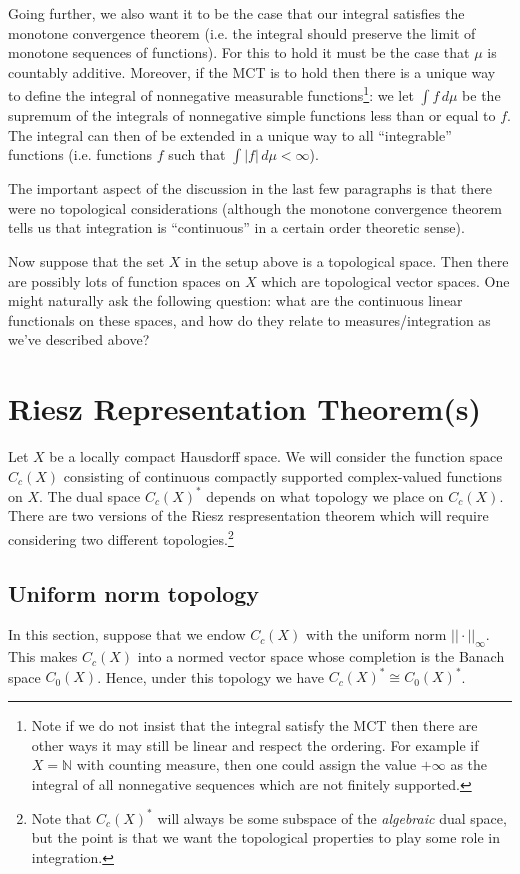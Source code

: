 \documentclass[a4paper,11pt,twoside]{amsart}
\newcommand{\N}{\mathbb{N}}
\theoremstyle{definition}
\begin{document}
Going further, we also want it to be the case that our integral satisfies the monotone convergence theorem (i.e. the integral should preserve the limit of monotone sequences of functions). For this to hold it must be the case that $\mu$ is countably additive. Moreover, if the MCT is to hold then there is a unique way to define the integral of nonnegative measurable functions\footnote{Note if we do not insist that the integral satisfy the MCT then there are other ways it may still be linear and respect the ordering. For example if $X=\N$ with counting measure, then one could assign the value $+\infty$ as the integral of all nonnegative sequences which are not finitely supported.}: we let $\int f\, d\mu$ be the supremum of the integrals of nonnegative simple functions less than or equal to $f$. The integral can then of be extended in a unique way to all ``integrable'' functions (i.e. functions $f$ such that $\int |f|\, d\mu < \infty$).

The important aspect of the discussion in the last few paragraphs is that there were no topological considerations (although the monotone convergence theorem tells us that integration is ``continuous'' in a certain order theoretic sense).

Now suppose that the set $X$ in the setup above is a topological space. Then there are possibly lots of function spaces on $X$ which are topological vector spaces. One might naturally ask the following question: what are the continuous linear functionals on these spaces, and how do they relate to measures/integration as we've described above?

\section{Riesz Representation Theorem(s)}

Let $X$ be a locally compact Hausdorff space. We will consider the function space $C_c(X)$ consisting of continuous compactly supported complex-valued functions on $X$. The dual space $C_c(X)^*$ depends on what topology we place on $C_c(X)$. There are two versions of the Riesz respresentation theorem which will require considering two different topologies.\footnote{Note that $C_c(X)^*$ will always be some subspace of the \emph{algebraic} dual space, but the point is that we want the topological properties to play some role in integration.}

\subsection{Uniform norm topology}
In this section, suppose that we endow $C_c(X)$ with the uniform norm $||\cdot||_\infty$. This makes $C_c(X)$ into a normed vector space whose completion is the Banach space $C_0(X)$. Hence, under this topology we have $C_c(X)^* \cong C_0(X)^*$.
\end{document}
